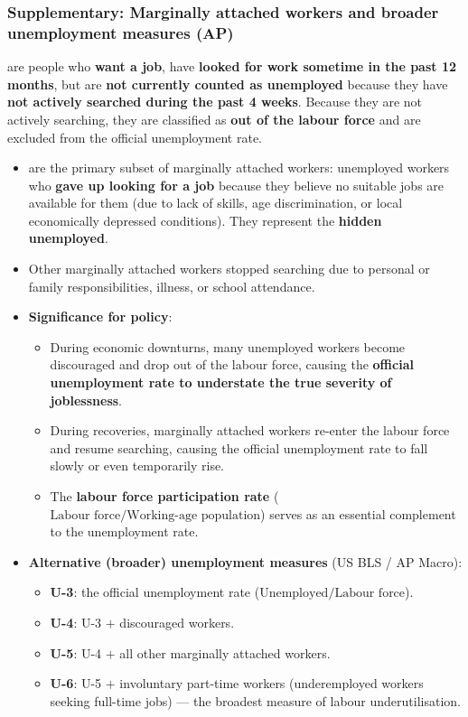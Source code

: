 \subsubsection*{Supplementary: Marginally attached workers and broader unemployment measures (AP)}
 are people who \textbf{want a job}, have \textbf{looked for work sometime in the past 12 months}, but are \textbf{not currently counted as unemployed} because they have \textbf{not actively searched during the past 4 weeks}. Because they are not actively searching, they are classified as \textbf{out of the labour force} and are excluded from the official unemployment rate.
\begin{itemize}
  \item {} are the primary subset of marginally attached workers: unemployed workers who \textbf{gave up looking for a job} because they believe no suitable jobs are available for them (due to lack of skills, age discrimination, or local economically depressed conditions). They represent the \textbf{hidden unemployed}.
  \item Other marginally attached workers stopped searching due to personal or family responsibilities, illness, or school attendance.
  \item \textbf{Significance for policy}:
  \begin{itemize}
    \item During economic downturns, many unemployed workers become discouraged and drop out of the labour force, causing the \textbf{official unemployment rate to understate the true severity of joblessness}.
    \item During recoveries, marginally attached workers re-enter the labour force and resume searching, causing the official unemployment rate to fall slowly or even temporarily rise.
    \item The \textbf{labour force participation rate} ($\text{Labour force} / \text{Working-age population}$) serves as an essential complement to the unemployment rate.
  \end{itemize}
  \item \textbf{Alternative (broader) unemployment measures} (US BLS / AP Macro):
  \begin{itemize}
    \item \textbf{U-3}: the official unemployment rate ($\text{Unemployed} / \text{Labour force}$).
    \item \textbf{U-4}: U-3 $+$ discouraged workers.
    \item \textbf{U-5}: U-4 $+$ all other marginally attached workers.
    \item \textbf{U-6}: U-5 $+$ involuntary part-time workers (underemployed workers seeking full-time jobs) --- the broadest measure of labour underutilisation.
  \end{itemize}
\end{itemize}
